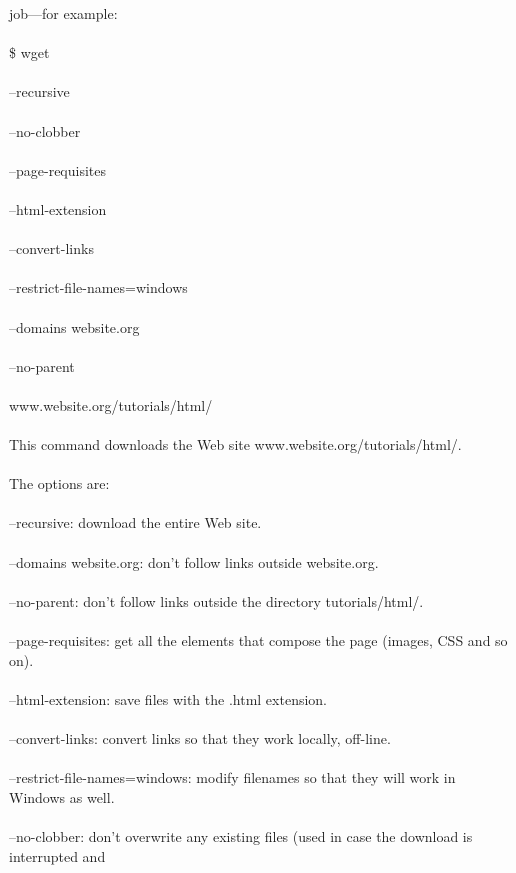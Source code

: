 \documentclass[10pt,a4paper]{article}
\begin{document}
{{{{{{{{{job—for example:\\
\\
\$ wget \\\\
     --recursive \\\\
     --no-clobber \\\\
     --page-requisites \\\\
     --html-extension \\\\
     --convert-links \\\\
     --restrict-file-names=windows \\\\
     --domains website.org \\\\
     --no-parent \\\\
         www.website.org/tutorials/html/}{\large \\
\\
This command downloads the Web site www.website.org/tutorials/html/.}{\large \\
\\
The options are:\\
\\
    --recursive: download the entire Web site.\\
\\
    --domains website.org: don't follow links outside website.org.\\
\\
    --no-parent: don't follow links outside the directory tutorials/html/.\\
\\
    --page-requisites: get all the elements that compose the page (images, CSS and so on).\\
\\
    --html-extension: save files with the .html extension.\\
\\
    --convert-links: convert links so that they work locally, off-line.\\
\\
    --restrict-file-names=windows: modify filenames so that they will work in Windows as well.\\
\\
    --no-clobber: don't overwrite any existing files (used in case the download is interrupted and\\
}}}}}}}}}
\end{document}
